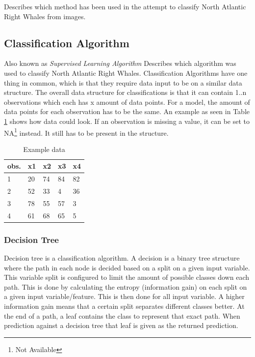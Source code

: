 Describes which method has been used in the attempt to classify North Atlantic Right Whales from images.

\subsection{Classification Algorithm}
Also known as \emph{Supervised Learning Algorithm}
Describes which algorithm was used to classify North Atlantic Right Whales. Classification Algorithms have one thing in common, which is that they require data input to be on a similar data structure.
The overall data structure for classifications is that it can contain 1..n observations which each has x amount of data points. For a model, the amount of data points for each observation has to be the same. An example as seen in Table \ref{tab:example data} shows how data could look.
If an observation is missing a value, it can be set to NA\footnote{Not Available} instead. It still has to be present in the structure.

\begin{table}
  \centering
  \caption{Example data}
  \label{tab:example data}
  \begin{tabularx}{\linewidth}{|l|X|X|X|X|} \hline
    obs. & x1 & x2 & x3 & x4 \\ \hline
    1    & 20 & 74 & 84 & 82 \\ \hline
    2    & 52 & 33 & 4  & 36 \\ \hline
    3    & 78 & 55 & 57 & 3  \\ \hline
    4    & 61 & 68 & 65 & 5  \\ \hline
  \end{tabularx}
\end{table}

\subsubsection{Decision Tree}
Decision tree is a classification algorithm. 
A decision is a binary tree structure where the path in each node is decided based on a split on a given input variable.
This variable split is configured to limit the amount of possible classes down each path. This is done by calculating the entropy (information gain) on each split on a given input variable/feature. This is then done for all input variable. A higher information gain means that a certain split separates different classes better.  
At the end of a path, a leaf contains the class to represent that exact path.
When prediction against a decision tree that leaf is given as the returned prediction.

